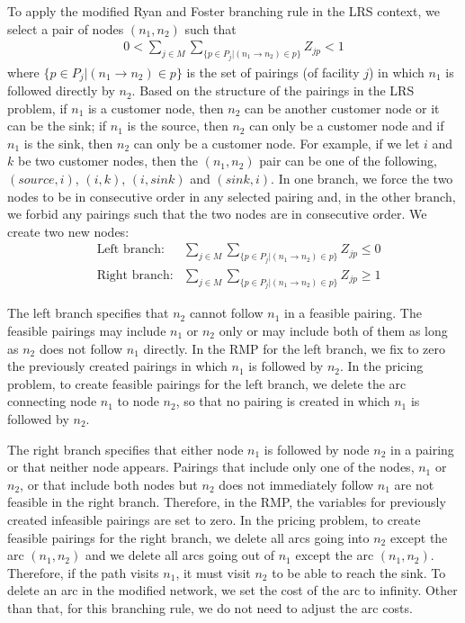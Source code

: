\begin {itemize}
  To apply the modified Ryan and Foster branching rule in the LRS context, we select a pair 
  of nodes $(n_1,n_2)$ such that  
  \begin{eqnarray}
    \label{branchingrule4-con}
    0 < \sum_{j \in M}\sum_{\{p \in P_j | (n_1\to n_2) \in p\}} Z_{jp} <1
  \end{eqnarray}       
  where $\{p \in P_j | (n_1\to n_2) \in p\}$ is the set of pairings (of facility $j$)
  in which $n_1$ is followed directly by $n_2$. Based on the structure of the pairings in the LRS 
  problem, if $n_1$ is a customer node, then $n_2$ can be another customer node or it can be the sink; if
  $n_1$ is the source, then $n_2$ can only be a customer node and if $n_1$ is the sink, then $n_2$ can 
  only be a customer
  node.  For example, if we let $i$ and $k$ be two customer nodes, then the $(n_1,n_2)$ pair 
  can be one of the following, $(source,i)$, $(i,k)$, $(i,sink)$ and $(sink,i)$. In one branch, we 
  force the two nodes to be   in consecutive order in any selected pairing and, in the other branch, 
  we forbid any pairings such that the two nodes are in consecutive order. We create two new nodes: 
  \begin{eqnarray}
    & \mbox{Left branch:} & \sum_{j \in M}\sum_{\{p \in P_j | (n_1\to n_2) \in p\}} Z_{jp} \leq  0 \nonumber \\
    & \mbox{Right branch:} & \sum_{j \in M}\sum_{\{p \in P_j | (n_1\to n_2) \in p\}} Z_{jp} \geq  1 \nonumber 
  \end{eqnarray}       

  The left branch specifies that $n_2$ cannot follow $n_1$ in a feasible pairing. The feasible pairings 
  may include $n_1$ or $n_2$ only or may include both of them as long as $n_2$ does not follow $n_1$ directly. 
  In the RMP for the left branch, we fix to zero the previously created pairings in which $n_1$ is 
  followed by $n_2$. In the pricing problem, to create feasible pairings for the left branch, we delete
  the arc connecting node $n_1$ to node $n_2$, so that  no pairing is created in which $n_1$ is followed by $n_2$.
 
  The right branch specifies that either node $n_1$ is followed by node $n_2$ in a pairing or that neither 
  node appears. Pairings that include only one of the nodes, $n_1$ or $n_2$, or that include both nodes
  but $n_2$ does not immediately follow $n_1$ are not feasible in the right branch. Therefore, in the RMP, the 
  variables for previously created infeasible pairings are set to zero. In the pricing problem, to create feasible
  pairings for the right branch, we delete all arcs going into $n_2$ except the arc $(n_1,n_2)$ and
  we delete all arcs going out of $n_1$ except the arc $(n_1,n_2)$. Therefore, if the path visits $n_1$,
  it must visit $n_2$ to be able to reach the sink. To delete an arc in the modified network, we set the cost of 
  the arc to infinity. Other than that, for this branching rule, we do not need to adjust the arc costs. 
\end{itemize}

